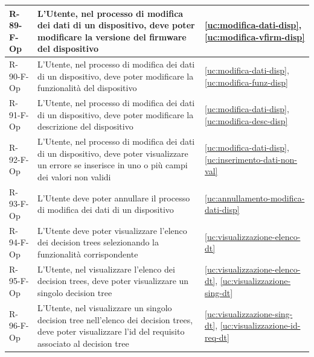 ﻿\documentclass[a4paper,12pt]{article}
\begin{document}
{{\begin{longtable}{|l|p{}|p{}|}
            R-89-F-Op       & L'Utente, nel processo di modifica dei dati di un dispositivo, deve poter modificare la versione del firmware del dispositivo                                                               & \ref{uc:modifica-dati-disp}, \ref{uc:modifica-vfirm-disp}                 \\ \hline
            R-90-F-Op       & L'Utente, nel processo di modifica dei dati di un dispositivo, deve poter modificare la funzionalità del dispositivo                                                                        & \ref{uc:modifica-dati-disp}, \ref{uc:modifica-funz-disp}                 \\ \hline
            R-91-F-Op       & L'Utente, nel processo di modifica dei dati di un dispositivo, deve poter modificare la descrizione del dispositivo                                                                         & \ref{uc:modifica-dati-disp}, \ref{uc:modifica-desc-disp}                 \\ \hline
            R-92-F-Op       & L'Utente, nel processo di modifica dei dati di un dispositivo, deve poter visualizzare un errore se inserisce in uno o più campi dei valori non validi                                      & \ref{uc:modifica-dati-disp}, \ref{uc:inserimento-dati-non-val}                     \\ \hline
            R-93-F-Op       & L'Utente deve poter annullare il processo di modifica dei dati di un dispositivo                                                                                                            & \ref{uc:annullamento-modifica-dati-disp}                                               \\ \hline
            R-94-F-Op       & L'Utente deve poter visualizzare l'elenco dei decision trees selezionando la funzionalità corrispondente                                                                                    & \ref{uc:visualizzazione-elenco-dt}                                               \\ \hline
            R-95-F-Op       & L'Utente, nel visualizzare l'elenco dei decision trees, deve poter visualizzare un singolo decision tree                                                                                    & \ref{uc:visualizzazione-elenco-dt}, \ref{uc:visualizzazione-sing-dt}                 \\ \hline
            R-96-F-Op       & L'Utente, nel visualizzare un singolo decision tree nell'elenco dei decision trees, deve poter visualizzare l'id del requisito associato al decision tree                                   & \ref{uc:visualizzazione-sing-dt}, \ref{uc:visualizzazione-id-req-dt}             \\ \hline

\end{longtable}}}
\end{document}
